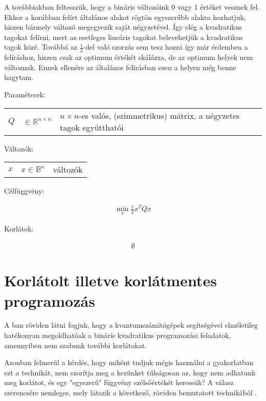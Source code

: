 A továbbiakban feltesszük, hogy a bináris változóink 0 vagy 1 értéket vesznek fel. Ekkor a korábban felírt általános alakot rögtön egyszerűbb alakra hozhatjuk, hiszen bármely változó megegyezik saját négyzetével. Így elég a kvadratikus tagokat felírni, mert az esetleges lineáris tagokat belevehetjük a kvadratikus tagok közé. Továbbá az $\frac{1}{2}$-del való szorzás sem tesz hozzá így már érdemben a felíráshoz, hiszen csak az optimum értékét skálázza, de az optimum helyek nem változnak. Ennek ellenére az általános felírásban ezen a helyen még benne hagytam.

Paraméterek:

\begin{tabular}{lll}
	$Q$ & $\in \mathbb{R}^{n×n}$  & $n × n$-es valós, (szimmetrikus) mátrix, a négyzetes tagok együtthatói \\
\end{tabular}

Változók:

\begin{tabular}{lll}
	$x$ & $x \in \mathbb{B}^n$ & változók \\
\end{tabular}

Célfüggvény:

\begin{align}
	\min_{x} \frac{1}{2} x^T Q x
\end{align}

Korlátok:

\begin{align}
	\emptyset
\end{align}



\section{Korlátolt illetve korlátmentes programozás}

A ban röviden látni fogjuk, hogy a kvantumszámítógépek segítségével elméletileg hatékonyan megoldhatóak a bináris kvadratikus programozási feladatok, amennyiben nem szabunk további korlátokat.

Azonban felmerül a kérdés, hogy miként tudjuk mégis használni a gyakorlatban ezt a technikát, nem szorítja meg a kezünket túlságosan az, hogy nem adhatunk meg korlátot, és egy "egyszerű" függvény szélsőértékét keressük? A válasz szerencsére nemleges, mely látszik a következő, röviden bemutatott technikából \cite{DBLP:journals/corr/abs-1811-11538}. 

